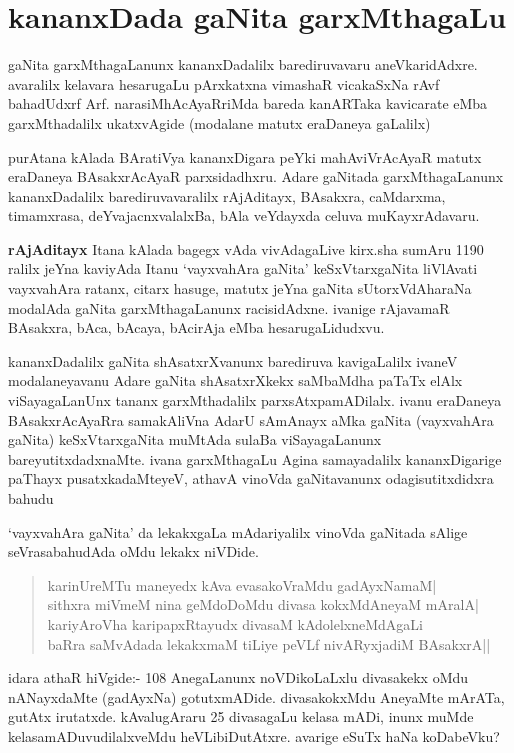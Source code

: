 \chapter{kananxDada gaNita garxMthagaLu}

gaNita garxMthagaLanunx kananxDadalilx barediruvavaru aneVkaridAdxre. avaralilx kelavara hesarugaLu pArxkatxna vimashaR vicakaSxNa rAvf bahadUdxrf Arf. narasiMhAcAyaRriMda bareda kanARTaka kavicarate eMba garxMthadalilx ukatxvAgide (modalane matutx eraDaneya  gaLalilx)

purAtana kAlada BAratiVya kananxDigara peYki mahAviVrAcAyaR matutx eraDaneya BAsakxrAcAyaR parxsidadhxru. Adare gaNitada garxMthagaLanunx kananxDadalilx barediruvavaralilx rAjAditayx, BAsakxra, caMdarxma, timamxrasa, deYvajacnxvalalxBa, bAla veYdayxda celuva muKayxrAdavaru.

\textbf{rAjAditayx} Itana kAlada bagegx vAda vivAdagaLive kirx.sha sumAru {\rm 1190} ralilx jeYna kaviyAda Itanu `vayxvahAra gaNita' keSxVtarxgaNita liVlAvati vayxvahAra ratanx, citarx hasuge, matutx jeYna gaNita sUtorxVdAharaNa modalAda gaNita garxMthagaLanunx racisidAdxne. ivanige rAjavamaR BAsakxra, bAca, bAcaya, bAcirAja eMba hesarugaLidudxvu.

kananxDadalilx gaNita shAsatxrXvanunx barediruva kavigaLalilx ivaneV modalaneyavanu Adare gaNita shAsatxrXkekx saMbaMdha paTaTx elAlx viSayagaLanUnx tananx garxMthadalilx parxsAtxpamADilalx. ivanu eraDaneya BAsakxrAcAyaRra samakAliVna AdarU sAmAnayx aMka gaNita (vayxvahAra gaNita) keSxVtarxgaNita muMtAda sulaBa viSayagaLanunx bareyutitxdadxnaMte. ivana garxMthagaLu Agina samayadalilx kananxDigarige paThayx pusatxkadaMteyeV, athavA vinoVda gaNitavanunx odagisutitxdidxra bahudu

`vayxvahAra gaNita' da lekakxgaLa mAdariyalilx vinoVda gaNitada sAlige seVrasabahudAda oMdu lekakx niVDide.
\begin{verse}
karinUreMTu maneyedx kAva evasakoVraMdu gadAyxNamaM|\\
sithxra miVmeM nina geMdoDoMdu divasa kokxMdAneyaM mAralA|\\
kariyAroVha karipapxRtayudx divasaM kAdolelxneMdAgaLi\\
baRra saMvAdada lekakxmaM tiLiye peVLf nivARyxjadiM BAsakxrA||
\end{verse}

idara athaR hiVgide:- {\rm 108} AnegaLanunx noVDikoLaLxlu divasakekx oMdu nANayxdaMte (gadAyxNa) gotutxmADide. divasakokxMdu AneyaMte mArATa, gutAtx irutatxde. kAvalugAraru {\rm 25} divasagaLu kelasa mADi, inunx muMde kelasamADuvudilalxveMdu heVLibiDutAtxre. avarige eSuTx haNa koDabeVku?


